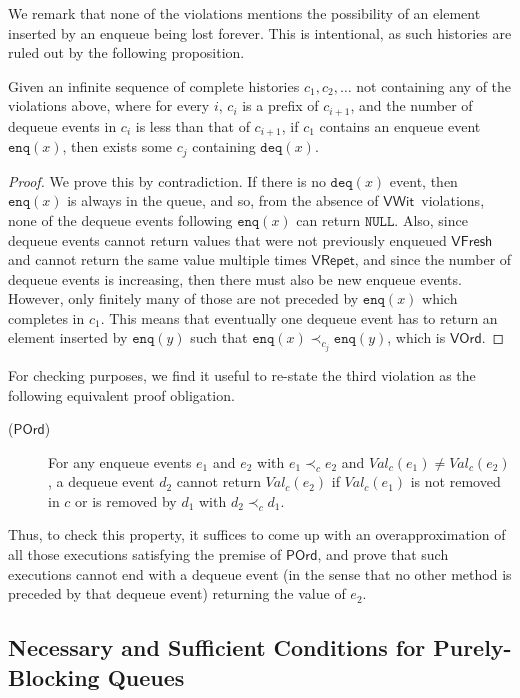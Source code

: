 \documentclass{LMCS}
\newcommand{\NULL}{\ensuremath{\mathtt{NULL}}}
\newcommand{\enq}{\ensuremath{\mathtt{enq}}}
\newcommand{\deq}{\ensuremath{\mathtt{deq}}}
\newcommand{\Val}[2]{\ensuremath{\mathit{Val}_{#1}({#2})}}
\newcommand{\VFresh}{\ensuremath{\mathsf{VFresh}}}
\newcommand{\VRepet}{\ensuremath{\mathsf{VRepet}}}
\newcommand{\VOrd}{\ensuremath{\mathsf{VOrd}}}
\newcommand{\VWit}{\ensuremath{\mathsf{VWit}}}
\newcommand{\POrd}{\ensuremath{\mathsf{POrd}}}
\begin{document}
We remark that none of the violations  mentions the possibility of an
element inserted by an enqueue being lost forever.  This is intentional, as
such histories are ruled out by the following proposition.

\begin{prop}
Given an infinite sequence of complete histories $c_1,c_2,\ldots$ 
not containing any of the violations above, 
where for every $i$, $c_i$ is a prefix of
$c_{i+1}$, and the number of dequeue events in $c_i$ is less than that of $c_{i+1}$,
if $c_1$ contains an enqueue event $\enq(x)$,
then exists some $c_j$ containing $\deq(x)$.
\end{prop}

\begin{proof}
We prove this by contradiction. 
If there is no $\deq(x)$ event, then $\enq(x)$ is always in the queue, 
and so, from the absence of \VWit\ violations, none of the dequeue events
following $\enq(x)$ can return \NULL.
Also, since dequeue events cannot return values that were not previously
enqueued {\VFresh} and cannot return the same value multiple times {\VRepet},
and since the number of dequeue events is increasing, then there must also be
new enqueue events.
However, only finitely many of those are not preceded by $\enq(x)$ which
completes in $c_1$. 
This means that eventually one dequeue event has to return an element inserted
by $\enq(y)$ such that $\enq(x)\prec_{c_j}\enq(y)$, which is \VOrd.
\end{proof}

For checking purposes, we find it useful to re-state the third violation as the following
equivalent proof obligation.
\begin{description}
\item[(\POrd)]
For any enqueue events $e_1$ and $e_2$ with $e_1\prec_c e_2$ and \mbox{$\Val{c}{e_1}\neq\Val{c}{e_2}$},
a dequeue event $d_2$ cannot return $\Val{c}{e_2}$ 
if $\Val{c}{e_1}$ is not removed in $c$ or is removed by $d_1$ with $d_2\prec_c d_1$.
\end{description}
Thus, to check this property, it suffices to come up with an overapproximation of
all those executions satisfying the premise of \POrd, and prove that such executions
cannot end with a dequeue event (in the sense that no other method is preceded 
by that dequeue event) returning the value of $e_2$.

\subsection*{Necessary and Sufficient Conditions for Purely-Blocking Queues}
\end{document}
